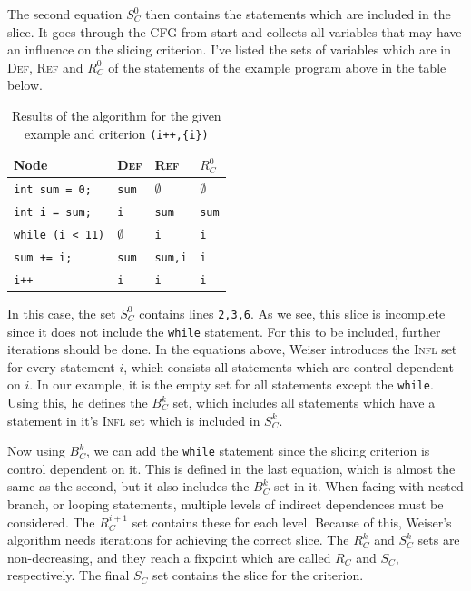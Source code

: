 \documentclass[oneside,12pt,a4paper]{book}
\begin{document}
The second equation $S^0_C$ then contains the statements which are included in the slice. It goes through the CFG from start and collects all variables that may have an influence on the slicing criterion. I've listed the sets of variables which are in \textsc{Def}, \textsc{Ref} and $R^0_C$ of the statements of the example program above in the table below.

\begin{table}[h]
  \centering
  	\begin{tabular}{|l|l|l|l|}
\hline
Node                     & \textsc{Def} & \textsc{Ref}   & $R^0_C$      \\ \hline
\texttt{int sum = 0;}    & \texttt{sum} & $\emptyset$    & $\emptyset$  \\ \hline
\texttt{int i = sum;}    & \texttt{i}   & \texttt{sum}   & \texttt{sum} \\ \hline
\texttt{while (i < 11)}  & $\emptyset$  & \texttt{i}     & \texttt{i}   \\ \hline
\texttt{sum += i;}       & \texttt{sum} & \texttt{sum,i} & \texttt{i}   \\ \hline
\texttt{i++}             & \texttt{i}   & \texttt{i}     & \texttt{i}   \\ \hline
  \end{tabular}
  \caption{Results of the algorithm for the given example and criterion \texttt{(i++,\{i\})} }
  \label{tab:weiserExampleTable}
\end{table}

In this case, the set $S^0_C$ contains lines \texttt{2,3,6}. As we see, this slice is incomplete since it does not include the \texttt{while} statement. For this to be included, further iterations should be done. In the equations above, Weiser introduces the \textsc{Infl} set for every statement $i$, which consists all statements which are control dependent on $i$. In our example, it is the empty set for all statements except the \texttt{while}. Using this, he defines the $B^k_C$ set, which includes all statements which have a statement in it's \textsc{Infl} set which is included in $S^k_C$. 

Now using $B^k_C$, we can add the \texttt{while} statement since the slicing criterion is control dependent on it. This is defined in the last equation, which is almost the same as the second, but it also includes the $B^k_C$ set in it. When facing with nested branch, or looping statements, multiple levels of indirect dependences must be considered. The $R^{i+1}_C$ set contains these for each level. Because of this, Weiser's algorithm needs iterations for achieving the correct slice. The $R^k_C$ and $S^k_C$ sets are non-decreasing, and they reach a fixpoint which are called $R_C$ and $S_C$, respectively. The final $S_C$ set contains the slice for the criterion.
\end{document}
